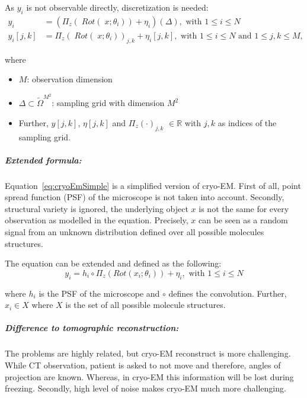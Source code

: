 As $y_i$ is not observable directly, discretization is needed:
\begin{equation}
    \label{eq:cryoEmSimpleDiscrete}
    \begin{aligned}
        y_i &= \left( \Pi_z (\; Rot (\;x; \theta_i)) + \eta_i\right)(\Delta), \text{ with } 1 \leq i \leq N \\
        y_i[j,k] &= \Pi_z (\; Rot(\;x; \theta_i))_{j,k} + \eta_i[j,k], \text{ with } 1 \leq i \leq N \text{ and } 1 \leq j,k \leq M,
    \end{aligned}
\end{equation}

where 
\begin{itemize}
    \item $M$: observation dimension
    \item $\Delta \subset \tilde{\Omega}^{M^2}$: sampling grid with dimension $M^2$
    \item Further, $y[j,k]$, $\eta[j,k]$ and $\Pi_z(\cdot)_{j,k}$ $ \in \mathbb{R}$ with $j,k$ as indices of the sampling grid.
\end{itemize}



\subparagraph{Extended formula:} 
Equation~\ref{eq:cryoEmSimple} is a simplified version of cryo-EM.
First of all, point spread function (PSF) of the microscope is not taken into account.
Secondly, structural variety is ignored, the underlying object $x$ is not the same 
for every observation as modelled in the equation. 
Precisely, $x$ can be seen as a random signal from an unknown distribution defined over all possible molecules structures.

The equation can be extended and defined as the following:
\begin{equation}
    \label{eq:cryoEmExtended}
    y_i = h_i \circ \Pi_z ( Rot (x_i; \theta_i)) + \eta_i, \text{ with } 1 \leq i \leq N
\end{equation}

where $h_i$ is the PSF of the microscope and $\circ$ defines the convolution.
Further, $x_i \in X$ where $X$ is the set of all possible molecule structures.


\subparagraph{Difference to tomographic reconstruction:}
The problems are highly related, but cryo-EM reconstruct is more challenging.
While CT observation, patient is asked to not move and therefore, angles of projection are known.
Whereas, in cryo-EM this information will be lost during freezing.
Secondly, high level of noise makes cryo-EM much more challenging.



